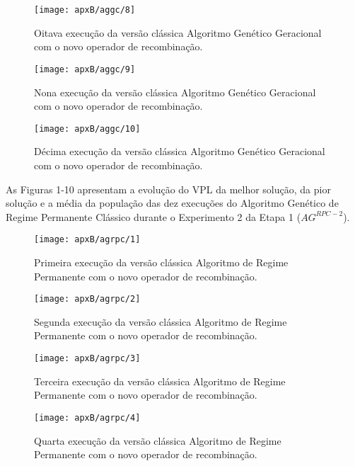 \begin{figure}[H]
\centering
\texttt{[image: apxB/aggc/8]}
\caption{Oitava execução da versão clássica Algoritmo Genético Geracional com o novo operador de recombinação.}
\label{fig:graphGC2-08}
\end{figure}

\begin{figure}[H]
\centering
\texttt{[image: apxB/aggc/9]}
\caption{Nona execução da versão clássica Algoritmo Genético Geracional com o novo operador de recombinação.}
\label{fig:graphGC2-09}
\end{figure}

\begin{figure}[H]
\centering
\texttt{[image: apxB/aggc/10]}
\caption{Décima execução da versão clássica Algoritmo Genético Geracional com o novo operador de recombinação.}
\label{fig:graphGC2-10}
\end{figure}

As Figuras 1-10 apresentam a evolução do VPL da melhor solução, da pior solução e a média da população das dez execuções do Algoritmo Genético de Regime Permanente Clássico durante o Experimento 2 da Etapa 1 ($AG^{RPC-2}$).

\begin{figure}[H]
\centering
\texttt{[image: apxB/agrpc/1]}
\caption{Primeira execução da versão clássica Algoritmo de Regime Permanente com o novo operador de recombinação.}
\label{fig:graphRPC2-01}
\end{figure}

\begin{figure}[H]
\centering
\texttt{[image: apxB/agrpc/2]}
\caption{Segunda execução da versão clássica Algoritmo de Regime Permanente com o novo operador de recombinação.}
\label{fig:graphRPC2-02}
\end{figure}

\begin{figure}[H]
\centering
\texttt{[image: apxB/agrpc/3]}
\caption{Terceira execução da versão clássica Algoritmo de Regime Permanente com o novo operador de recombinação.}
\label{fig:graphRPC2-03}
\end{figure}

\begin{figure}[H]
\centering
\texttt{[image: apxB/agrpc/4]}
\caption{Quarta execução da versão clássica Algoritmo de Regime Permanente com o novo operador de recombinação.}
\label{fig:graphRPC2-04}
\end{figure}

